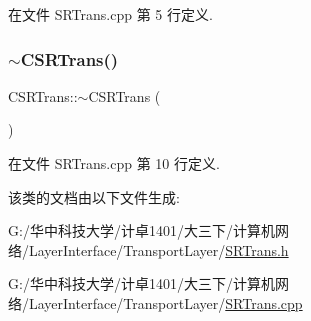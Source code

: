 在文件 S\+R\+Trans.\+cpp 第 5 行定义.

\mbox{\label{class_c_s_r_trans_a6ead60de09d2a377c5527da55c7ec484}} 
\subsubsection{\texorpdfstring{$\sim$\+C\+S\+R\+Trans()}{~CSRTrans()}}
{\footnotesize\ttfamily C\+S\+R\+Trans\+::$\sim$\+C\+S\+R\+Trans (\begin{DoxyParamCaption}{ }\end{DoxyParamCaption})}



在文件 S\+R\+Trans.\+cpp 第 10 行定义.



该类的文档由以下文件生成\+:\begin{DoxyCompactItemize}
\item 
G\+:/华中科技大学/计卓1401/大三下/计算机网络/\+Layer\+Interface/\+Transport\+Layer/\hyperlink{_s_r_trans_8h}{S\+R\+Trans.\+h}\item 
G\+:/华中科技大学/计卓1401/大三下/计算机网络/\+Layer\+Interface/\+Transport\+Layer/\hyperlink{_s_r_trans_8cpp}{S\+R\+Trans.\+cpp}\end{DoxyCompactItemize}
